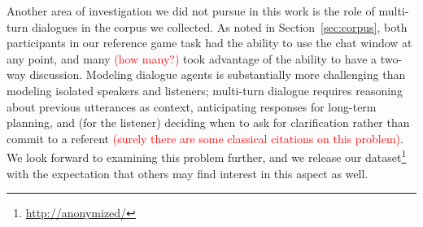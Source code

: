 \documentclass[11pt,letterpaper]{article}
\renewcommand{\|}{\mid}
\newcommand{\secref}[1]{Section~\ref{#1}}
\newcommand{\todocheck}[1]{\textcolor{red}{#1}}
\begin{document}
Another area of investigation we did not pursue in this work is the role of
multi-turn dialogues in the corpus we collected. As noted in \secref{sec:corpus},
both participants in our reference game task had the ability to use the chat window
at any point, and many \todocheck{(how many?)} took advantage of the ability
to have a two-way discussion. Modeling dialogue agents is substantially
more challenging than modeling isolated speakers and listeners; multi-turn dialogue
requires reasoning about previous utterances as context, anticipating
responses for long-term planning, and (for the listener) deciding when
to ask for clarification rather than commit to a referent
\todocheck{(surely there are some classical citations on this problem)}.
We look forward to examining this problem further, and we release our
dataset\footnote{\url{http://anonymized/}}
with the expectation that others may find interest in this aspect as well.
\end{document}
